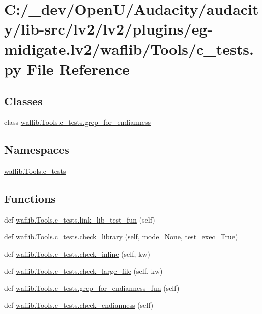 \hypertarget{lv2_2plugins_2eg-midigate_8lv2_2waflib_2_tools_2c__tests_8py}{}\section{C\+:/\+\_\+dev/\+Open\+U/\+Audacity/audacity/lib-\/src/lv2/lv2/plugins/eg-\/midigate.lv2/waflib/\+Tools/c\+\_\+tests.py File Reference}
\label{lv2_2plugins_2eg-midigate_8lv2_2waflib_2_tools_2c__tests_8py}
\subsection*{Classes}
\begin{DoxyCompactItemize}
\item 
class \hyperlink{classwaflib_1_1_tools_1_1c__tests_1_1grep__for__endianness}{waflib.\+Tools.\+c\+\_\+tests.\+grep\+\_\+for\+\_\+endianness}
\end{DoxyCompactItemize}
\subsection*{Namespaces}
\begin{DoxyCompactItemize}
\item 
 \hyperlink{namespacewaflib_1_1_tools_1_1c__tests}{waflib.\+Tools.\+c\+\_\+tests}
\end{DoxyCompactItemize}
\subsection*{Functions}
\begin{DoxyCompactItemize}
\item 
def \hyperlink{namespacewaflib_1_1_tools_1_1c__tests_a58fcfbe9b3ba09e1a057dc1276435776}{waflib.\+Tools.\+c\+\_\+tests.\+link\+\_\+lib\+\_\+test\+\_\+fun} (self)
\item 
def \hyperlink{namespacewaflib_1_1_tools_1_1c__tests_a6769fa909685b6d42bde7746f3e59a64}{waflib.\+Tools.\+c\+\_\+tests.\+check\+\_\+library} (self, mode=None, test\+\_\+exec=True)
\item 
def \hyperlink{namespacewaflib_1_1_tools_1_1c__tests_a8c36c48a71d56e13d6a7973972ef7fb8}{waflib.\+Tools.\+c\+\_\+tests.\+check\+\_\+inline} (self, kw)
\item 
def \hyperlink{namespacewaflib_1_1_tools_1_1c__tests_ac29778f60925677c62b37a4da6a94322}{waflib.\+Tools.\+c\+\_\+tests.\+check\+\_\+large\+\_\+file} (self, kw)
\item 
def \hyperlink{namespacewaflib_1_1_tools_1_1c__tests_a94db04af071d40c6a2b181ae0925389c}{waflib.\+Tools.\+c\+\_\+tests.\+grep\+\_\+for\+\_\+endianness\+\_\+fun} (self)
\item 
def \hyperlink{namespacewaflib_1_1_tools_1_1c__tests_a83231aa06753183ca283a2d9b4cf39ce}{waflib.\+Tools.\+c\+\_\+tests.\+check\+\_\+endianness} (self)
\end{DoxyCompactItemize}

